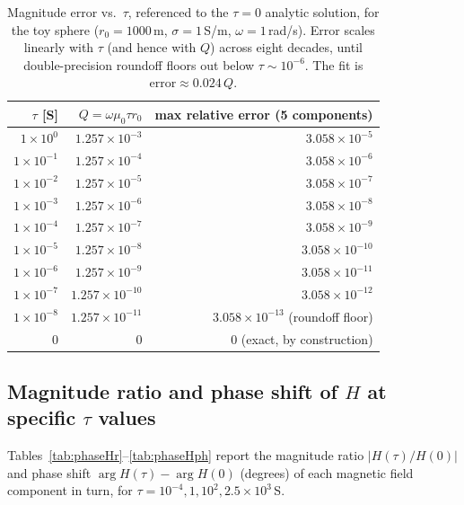 \documentclass[11pt]{article}
\begin{document}
\begin{table}[h]
\centering
\begin{tabular}{rrr}
\toprule
$\tau$ [S] & $Q=\omega\mu_0\tau r_0$ & max relative error (5 components) \\
\midrule
$1\times 10^{0}$  & $1.257\times 10^{-3}$ & $3.058\times 10^{-5}$ \\
$1\times 10^{-1}$ & $1.257\times 10^{-4}$ & $3.058\times 10^{-6}$ \\
$1\times 10^{-2}$ & $1.257\times 10^{-5}$ & $3.058\times 10^{-7}$ \\
$1\times 10^{-3}$ & $1.257\times 10^{-6}$ & $3.058\times 10^{-8}$ \\
$1\times 10^{-4}$ & $1.257\times 10^{-7}$ & $3.058\times 10^{-9}$ \\
$1\times 10^{-5}$ & $1.257\times 10^{-8}$ & $3.058\times 10^{-10}$ \\
$1\times 10^{-6}$ & $1.257\times 10^{-9}$ & $3.058\times 10^{-11}$ \\
$1\times 10^{-7}$ & $1.257\times 10^{-10}$ & $3.058\times 10^{-12}$ \\
$1\times 10^{-8}$ & $1.257\times 10^{-11}$ & $3.058\times 10^{-13}$ (roundoff floor) \\
$0$               & $0$                    & $0$ (exact, by construction) \\
\bottomrule
\end{tabular}
\caption{Magnitude error vs.\ $\tau$, referenced to the $\tau=0$ analytic solution, for the toy
sphere ($r_0=1000$\,m, $\sigma=1$\,S/m, $\omega=1$\,rad/s). Error scales linearly with $\tau$ (and
hence with $Q$) across eight decades, until double-precision roundoff floors out below
$\tau\sim10^{-6}$. The fit is $\text{error}\approx 0.024\,Q$.}
\label{tab:magerr}
\end{table}

\subsection{Magnitude ratio and phase shift of $H$ at specific $\tau$ values}

Tables~\ref{tab:phaseHr}--\ref{tab:phaseHph} report the magnitude ratio $|H(\tau)/H(0)|$ and phase
shift $\arg H(\tau)-\arg H(0)$ (degrees) of each magnetic field component in turn, for
$\tau=10^{-4},1,10^{2},2.5\times10^{3}$\,S.
\end{document}
